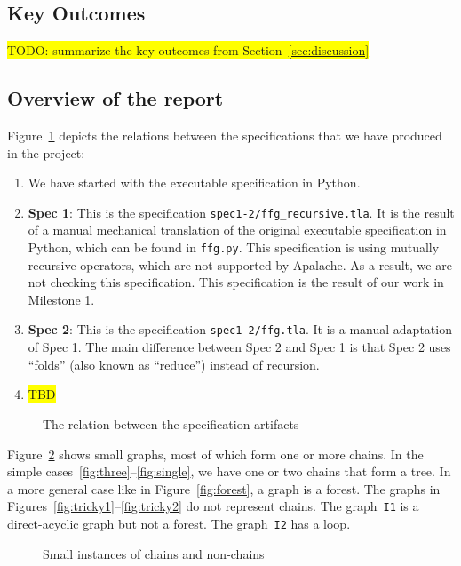 \subsection{Key Outcomes}

\colorbox{yellow}{TODO: summarize the key outcomes from Section~\ref{sec:discussion}}

\subsection{Overview of the report}

Figure~\ref{fig:artifacts} depicts the relations between the specifications
that we have produced in the project:

\begin{enumerate}
    \item We have started with the executable specification in Python.

    \item \textbf{Spec 1}: This is the specification
        \texttt{spec1-2/ffg\_recursive.tla}. It is the result of a manual
        mechanical translation of the original executable specification in
        Python, which can be found in \texttt{ffg.py}. This specification is
        using mutually recursive operators, which are not supported by
        Apalache. As a result, we are not checking this specification. This
        specification is the result of our work in Milestone 1.

    \item \textbf{Spec 2}: This is the specification \texttt{spec1-2/ffg.tla}. It
        is a manual adaptation of Spec 1. The main difference between Spec 2
        and Spec 1 is that Spec 2 uses ``folds'' (also known as ``reduce'')
        instead of recursion.

      \item \colorbox{yellow}{TBD}

\end{enumerate}

\begin{figure}
  
  \caption{The relation between the specification artifacts}\label{fig:artifacts}
\end{figure}

Figure~\ref{fig:block-graphs} shows small graphs, most of which form one or
more chains. In the simple cases~\ref{fig:three}--\ref{fig:single}, we have one
or two chains that form a tree. In a more general case like in
Figure~\ref{fig:forest}, a graph is a forest. The graphs in
Figures~\ref{fig:tricky1}--\ref{fig:tricky2} do not represent chains.  The
graph~\texttt{I1} is a direct-acyclic graph but not a forest. The
graph~\texttt{I2} has a loop.

\begin{figure}
  
  \caption{Small instances of chains and non-chains}\label{fig:block-graphs}
\end{figure}


